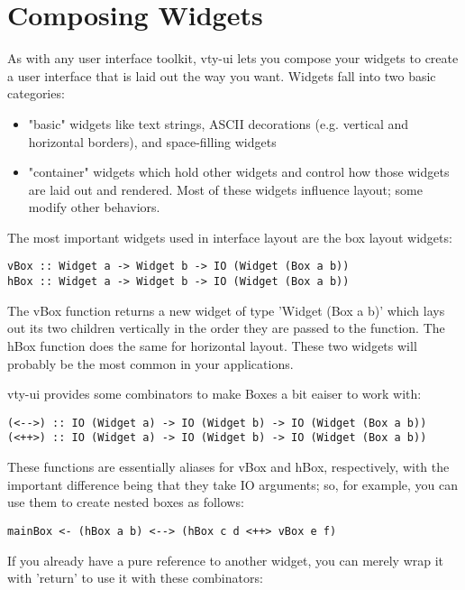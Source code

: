 \section{Composing Widgets}

As with any user interface toolkit, vty-ui lets you compose your widgets
to create a user interface that is laid out the way you want.  Widgets
fall into two basic categories:

\begin{itemize}
\item "basic" widgets like text strings, ASCII decorations
      (e.g. vertical and horizontal borders), and space-filling
      widgets
\item "container" widgets which hold other widgets and control how
      those widgets are laid out and rendered.  Most of these widgets
      influence layout; some modify other behaviors.
\end{itemize}

The most important widgets used in interface layout are the box layout
widgets:

\begin{verbatim}
vBox :: Widget a -> Widget b -> IO (Widget (Box a b))
hBox :: Widget a -> Widget b -> IO (Widget (Box a b))
\end{verbatim}

The vBox function returns a new widget of type 'Widget (Box a b)' which
lays out its two children vertically in the order they are passed to the
function.  The hBox function does the same for horizontal layout.  These
two widgets will probably be the most common in your applications.

vty-ui provides some combinators to make Boxes a bit eaiser to work
with:

\begin{verbatim}
(<-->) :: IO (Widget a) -> IO (Widget b) -> IO (Widget (Box a b))
(<++>) :: IO (Widget a) -> IO (Widget b) -> IO (Widget (Box a b))
\end{verbatim}

These functions are essentially aliases for vBox and hBox, respectively,
with the important difference being that they take IO arguments; so, for
example, you can use them to create nested boxes as follows:

\begin{verbatim}
mainBox <- (hBox a b) <--> (hBox c d <++> vBox e f)
\end{verbatim}

If you already have a pure reference to another widget, you can merely
wrap it with 'return' to use it with these combinators:

